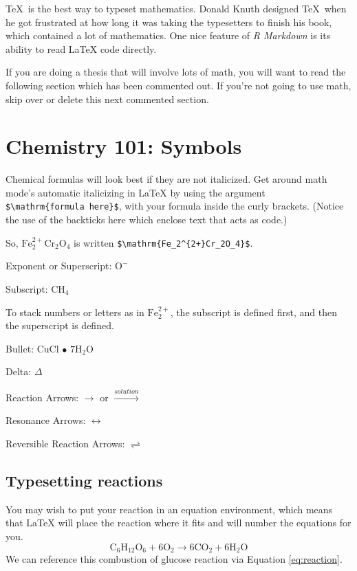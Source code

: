 \documentclass[12pt,twoside]{reedthesis}
\begin{document}
\TeX~is the best way to typeset mathematics. Donald Knuth designed \TeX~when he got frustrated at how long it was taking the typesetters to finish his book, which contained a lot of mathematics. One nice feature of \emph{R Markdown} is its ability to read LaTeX code directly.

If you are doing a thesis that will involve lots of math, you will want to read the following section which has been commented out. If you're not going to use math, skip over or delete this next commented section.

\hypertarget{chemistry-101-symbols}{%
\section{Chemistry 101: Symbols}\label{chemistry-101-symbols}}

Chemical formulas will look best if they are not italicized. Get around math mode's automatic italicizing in LaTeX by using the argument \texttt{\$\textbackslash{}mathrm\{formula\ here\}\$}, with your formula inside the curly brackets. (Notice the use of the backticks here which enclose text that acts as code.)

So, \(\mathrm{Fe_2^{2+}Cr_2O_4}\) is written \texttt{\$\textbackslash{}mathrm\{Fe\_2\^{}\{2+\}Cr\_2O\_4\}\$}.

\noindent Exponent or Superscript: \(\mathrm{O^-}\)

\noindent Subscript: \(\mathrm{CH_4}\)

To stack numbers or letters as in \(\mathrm{Fe_2^{2+}}\), the subscript is defined first, and then the superscript is defined.

\noindent Bullet: CuCl \(\bullet\) \(\mathrm{7H_{2}O}\)

\noindent Delta: \(\Delta\)

\noindent Reaction Arrows: \(\longrightarrow\) or \(\xrightarrow{solution}\)

\noindent Resonance Arrows: \(\leftrightarrow\)

\noindent Reversible Reaction Arrows: \(\rightleftharpoons\)

\hypertarget{typesetting-reactions}{%
\subsection{Typesetting reactions}\label{typesetting-reactions}}

You may wish to put your reaction in an equation environment, which means that LaTeX will place the reaction where it fits and will number the equations for you.
\begin{equation}
  \mathrm{C_6H_{12}O_6  + 6O_2} \longrightarrow \mathrm{6CO_2 + 6H_2O}
  \label{eq:reaction}
\end{equation}
We can reference this combustion of glucose reaction via Equation \eqref{eq:reaction}.
\end{document}
